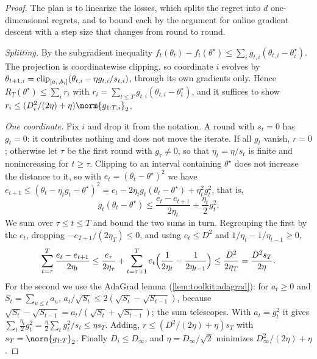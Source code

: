 \begin{refsection}
\begin{proof}
The plan is to linearize the losses, which splits the regret into $d$ one-dimensional regrets, and to bound each by the argument for online gradient descent with a step size that changes from round to round.

\emph{Splitting.} By the subgradient inequality $f_t(\theta_t)-f_t(\theta^\star)\le\sum_ig_{t,i}(\theta_{t,i}-\theta^\star_i)$. The projection is coordinatewise clipping, so coordinate $i$ evolves by $\theta_{t+1,i}=\operatorname{clip}_{[a_i,b_i]}(\theta_{t,i}-\eta g_{t,i}/s_{t,i})$, through its own gradients only. Hence $R_T(\theta^\star)\le\sum_ir_i$ with $r_i=\sum_{t\le T}g_{t,i}(\theta_{t,i}-\theta^\star_i)$, and it suffices to show $r_i\le(D_i^2/(2\eta)+\eta)\norm{g_{1:T,i}}_2$.

\emph{One coordinate.} Fix $i$ and drop it from the notation. A round with $s_t=0$ has $g_t=0$: it contributes nothing and does not move the iterate. If all $g_t$ vanish, $r=0$; otherwise let $\tau$ be the first round with $g_\tau\neq0$, so that $\eta_t=\eta/s_t$ is finite and nonincreasing for $t\ge\tau$. Clipping to an interval containing $\theta^\star$ does not increase the distance to it, so with $e_t=(\theta_t-\theta^\star)^2$ we have $e_{t+1}\le(\theta_t-\eta_tg_t-\theta^\star)^2=e_t-2\eta_tg_t(\theta_t-\theta^\star)+\eta_t^2g_t^2$, that is,
\[
  g_t(\theta_t-\theta^\star)\le\frac{e_t-e_{t+1}}{2\eta_t}+\frac{\eta_t}2g_t^2 .
\]
We sum over $\tau\le t\le T$ and bound the two sums in turn. Regrouping the first by the $e_t$, dropping $-e_{T+1}/(2\eta_T)\le0$, and using $e_t\le D^2$ and $1/\eta_t-1/\eta_{t-1}\ge0$,
\[
  \sum_{t=\tau}^T\frac{e_t-e_{t+1}}{2\eta_t}\le\frac{e_\tau}{2\eta_\tau}+\sum_{t=\tau+1}^Te_t\Bigl(\frac1{2\eta_t}-\frac1{2\eta_{t-1}}\Bigr)\le\frac{D^2}{2\eta_T}=\frac{D^2s_T}{2\eta}.
\]
For the second we use the AdaGrad lemma (\cref{lem:toolkit:adagrad}): for $a_t\ge0$ and $S_t=\sum_{u\le t}a_u$, $a_t/\sqrt{S_t}\le2(\sqrt{S_t}-\sqrt{S_{t-1}})$, because $\sqrt{S_t}-\sqrt{S_{t-1}}=a_t/(\sqrt{S_t}+\sqrt{S_{t-1}})$; the sum telescopes. With $a_t=g_t^2$ it gives $\sum_t\frac{\eta_t}2g_t^2=\frac\eta2\sum_tg_t^2/s_t\le\eta s_T$. Adding, $r\le(D^2/(2\eta)+\eta)s_T$ with $s_T=\norm{g_{1:T}}_2$. Finally $D_i\le D_\infty$, and $\eta=D_\infty/\sqrt2$ minimizes $D_\infty^2/(2\eta)+\eta$.
\end{proof}


\end{refsection}
